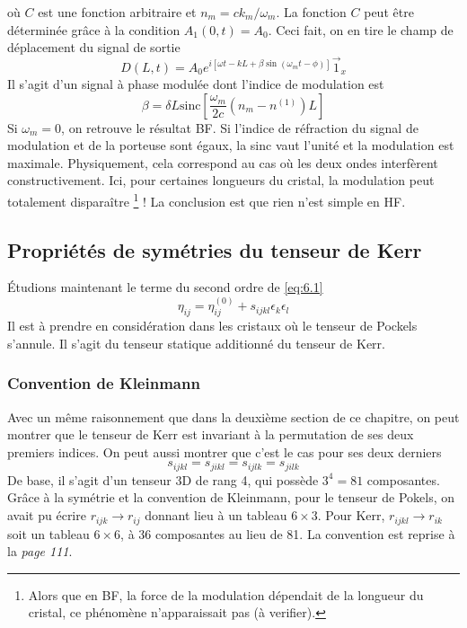 où $C$ est une fonction arbitraire et $n_m = ck_m/\omega_m$. La fonction $C$ peut être déterminée grâce à la 
condition $A_1(0,t)=A_0$. Ceci fait, on en tire le champ de déplacement du signal de sortie
\begin{equation}
D(L,t) = A_0e^{i\left[\omega t-kL+\beta\sin(\omega_mt-\phi)\right]}\vec{1}_x
\end{equation}
Il s'agit d'un signal à phase modulée dont l'indice de modulation est
\begin{equation}
\beta = \delta L \text{sinc}\left[\dfrac{\omega_m}{2c}\left(n_m-n^{(1)}\right)L\right]
\end{equation}
Si $\omega_m=0$, on retrouve le résultat BF. Si l'indice de réfraction du signal de modulation et de la 
porteuse sont égaux, la sinc vaut l'unité et la modulation est maximale. Physiquement, cela correspond 
au cas où les deux ondes interfèrent constructivement. Ici, pour certaines longueurs du cristal, la 
modulation peut totalement disparaître \footnote{Alors que en BF, la force de la modulation dépendait
de la longueur du cristal, ce phénomène n’apparaissait pas (à verifier).} ! La conclusion est que rien
n'est simple en HF. 

\newpage
\subsection{Propriétés de symétries du tenseur de Kerr}
Étudions maintenant le terme du second ordre de \eqref{eq:6.1}
\begin{equation}
\eta_{ij} = \eta_{ij}^{(0)}+s_{ijkl}\epsilon_k\epsilon_l
\end{equation}
Il est à prendre en considération dans les cristaux où le tenseur de Pockels s'annule. Il s'agit du
tenseur statique additionné du tenseur de Kerr.

\subsubsection{Convention de Kleinmann}
Avec un même raisonnement que dans la deuxième section de ce chapitre, on peut montrer que le tenseur de 
Kerr est invariant à la permutation de ses deux premiers indices. On peut aussi montrer que c'est le cas 
pour ses deux derniers
\begin{equation}
s_{ijkl} = s_{jikl} = s_{ijlk} = s_{jilk}
\end{equation}
De base, il s'agit d'un tenseur 3D de rang 4, qui possède $3^4=81$ composantes. Grâce à la symétrie et 
la convention de Kleinmann, pour le tenseur de Pokels, on avait pu écrire $r_{ijk}\to r_{ij}$ donnant
lieu à un tableau $6\times 3$. Pour Kerr, $r_{ijkl}\to r_{ik}$ soit un tableau $6\times6$, à 36 composantes
au lieu de 81. La convention est reprise à la \textit{page 111}.

